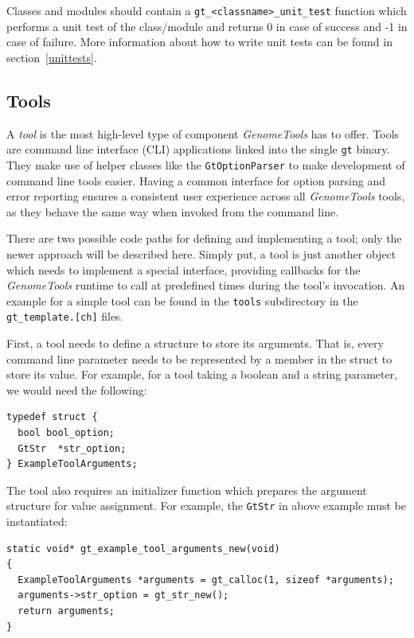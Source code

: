 \documentclass[11pt,final]{article}
\newcommand{\keyword}[1]{\lstinline{#1}}
\newcommand{\Gt}[0]{\emph{GenomeTools}\xspace}
\begin{document}
Classes and modules should contain a \keyword{gt_<classname>_unit_test} function
which performs a unit test of the class/module and returns 0 in case of success
and -1 in case of failure. More information about how to write unit tests can
be found in section~\ref{unittests}.

\subsection{Tools}

A \emph{tool} is the most high-level type of component \Gt has to offer. Tools
are command line interface (CLI) applications linked into the single \keyword{gt}
binary. They make use of helper classes like the \keyword{GtOptionParser} to
make development of command line tools easier. Having a common interface for
option parsing and error reporting ensures a consistent user experience across
all \Gt tools, as they behave the same way when invoked from the command line.

There are two possible code paths for defining and implementing a tool; only
the newer approach will be described here.
Simply put, a tool is just another object which needs to implement a special
interface, providing callbacks for the \Gt runtime to call at predefined times
during the tool's invocation. An example for a simple tool can
be found in the \keyword{tools} subdirectory in the \keyword{gt_template.[ch]}
files.

First, a tool needs to define a structure to store its arguments. That is,
every command line parameter needs to be represented by a member in the struct
to store its value. For example, for a tool taking a boolean and a string
parameter, we would need the following:

\begin{lstlisting}
typedef struct {
  bool bool_option;
  GtStr  *str_option;
} ExampleToolArguments;
\end{lstlisting}

The tool also requires an initializer function which prepares the argument
structure for value assignment. For example, the \keyword{GtStr} in above
example must be instantiated:

\begin{lstlisting}
static void* gt_example_tool_arguments_new(void)
{
  ExampleToolArguments *arguments = gt_calloc(1, sizeof *arguments);
  arguments->str_option = gt_str_new();
  return arguments;
}
\end{lstlisting}
\end{document}
